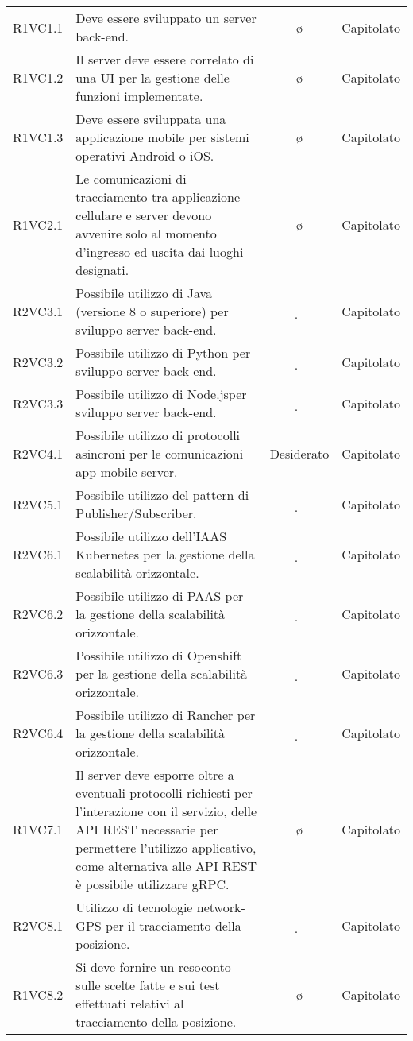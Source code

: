 {\begin{longtable}{ c C{6.5cm} c c}
R1VC1.1 & Deve essere sviluppato un server back-end. & \o & Capitolato \\
R1VC1.2 & Il server deve essere correlato di una UI per la gestione delle funzioni implementate. & \o & Capitolato \\
R1VC1.3 & Deve essere sviluppata una applicazione mobile per sistemi operativi Android o iOS. & \o & Capitolato \\
R1VC2.1 & Le comunicazioni di tracciamento tra applicazione cellulare e server devono avvenire solo al momento d’ingresso ed uscita dai luoghi designati. & \o & Capitolato \\
R2VC3.1 & Possibile utilizzo di Java (versione 8 o superiore) per sviluppo server back-end. & \d & Capitolato \\
R2VC3.2 & Possibile utilizzo di Python per sviluppo server back-end. & \d & Capitolato \\
R2VC3.3 & Possibile utilizzo di Node.jsper sviluppo server back-end. & \d & Capitolato \\
R2VC4.1 & Possibile utilizzo di protocolli asincroni per le comunicazioni app mobile-server. & Desiderato & Capitolato \\
R2VC5.1 & Possibile utilizzo del pattern di Publisher/Subscriber. & \d & Capitolato \\
R2VC6.1 & Possibile utilizzo dell’IAAS Kubernetes per la gestione della scalabilità orizzontale. & \d & Capitolato \\
R2VC6.2 & Possibile utilizzo di PAAS per la gestione della scalabilità orizzontale. & \d & Capitolato \\
R2VC6.3 & Possibile utilizzo di Openshift per la gestione della scalabilità orizzontale. & \d & Capitolato \\
R2VC6.4 & Possibile utilizzo di Rancher per la gestione della scalabilità orizzontale. & \d & Capitolato \\
R1VC7.1 & Il server deve esporre oltre a eventuali protocolli richiesti per l’interazione con il servizio, delle API REST necessarie per permettere l’utilizzo applicativo, come alternativa alle API REST è possibile utilizzare gRPC. & \o & Capitolato \\
R2VC8.1 & Utilizzo di tecnologie network-GPS per il tracciamento della posizione. & \d & Capitolato \\
R1VC8.2 & Si deve fornire un resoconto sulle scelte fatte e sui test effettuati relativi al tracciamento della posizione. & \o & Capitolato \\

\end{longtable}}
